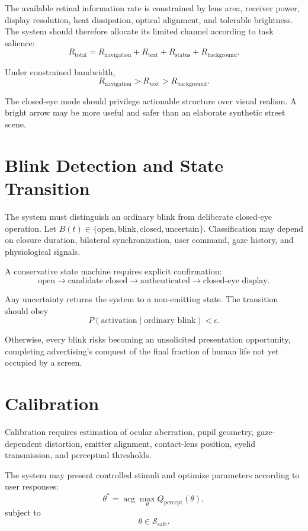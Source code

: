 \documentclass[11pt]{article}
\begin{document}
The available retinal information rate is constrained by lens area, receiver power, display resolution, heat dissipation, optical alignment, and tolerable brightness. The system should therefore allocate its limited channel according to task salience:
\[
R_{\mathrm{total}}=R_{\mathrm{navigation}}+R_{\mathrm{text}}+R_{\mathrm{status}}+R_{\mathrm{background}}.
\]

Under constrained bandwidth,
\[
R_{\mathrm{navigation}}>R_{\mathrm{text}}>R_{\mathrm{background}}.
\]

The closed-eye mode should privilege actionable structure over visual realism. A bright arrow may be more useful and safer than an elaborate synthetic street scene.

\section{Blink Detection and State Transition}

The system must distinguish an ordinary blink from deliberate closed-eye operation. Let $B(t)\in\{\text{open},\text{blink},\text{closed},\text{uncertain}\}$. Classification may depend on closure duration, bilateral synchronization, user command, gaze history, and physiological signals.

A conservative state machine requires explicit confirmation:
\[
\text{open}\rightarrow\text{candidate closed}\rightarrow\text{authenticated}\rightarrow\text{closed-eye display}.
\]

Any uncertainty returns the system to a non-emitting state. The transition should obey
\[
P(\text{activation}\mid\text{ordinary blink})<\epsilon.
\]

Otherwise, every blink risks becoming an unsolicited presentation opportunity, completing advertising's conquest of the final fraction of human life not yet occupied by a screen.

\section{Calibration}

Calibration requires estimation of ocular aberration, pupil geometry, gaze-dependent distortion, emitter alignment, contact-lens position, eyelid transmission, and perceptual thresholds.

The system may present controlled stimuli and optimize parameters according to user responses:
\[
\theta^\ast=\arg\max_\theta Q_{\mathrm{percept}}(\theta),
\]
subject to
\[
\theta\in\mathcal{S}_{\mathrm{safe}}.
\]
\end{document}
